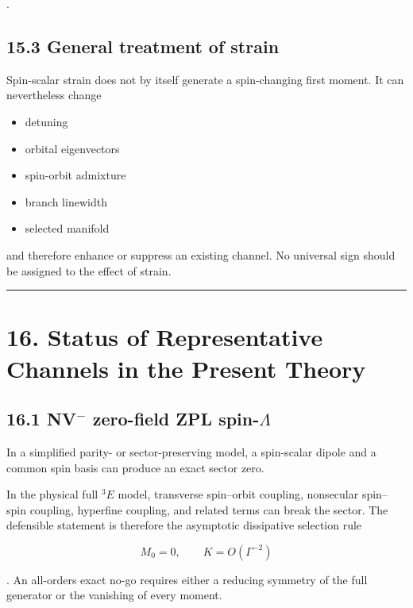 \documentclass[
  10pt,
  a4paper,
]{article}
\providecommand{\tightlist}{%
  \setlength{\itemsep}{0pt}\setlength{\parskip}{0pt}}
\begin{document}
.

\subsection{15.3 General treatment of
strain}\label{general-treatment-of-strain}

Spin-scalar strain does not by itself generate a spin-changing first
moment. It can nevertheless change

\begin{itemize}
\tightlist
\item
  detuning
\item
  orbital eigenvectors
\item
  spin-orbit admixture
\item
  branch linewidth
\item
  selected manifold
\end{itemize}

and therefore enhance or suppress an existing channel. No universal sign
should be assigned to the effect of strain.

\begin{center}\rule{0.5\linewidth}{0.5pt}\end{center}

\section{16. Status of Representative Channels in the Present
Theory}\label{status-of-representative-channels-in-the-present-theory}

\subsection{\texorpdfstring{16.1 NV\(^{-}\) zero-field ZPL
spin-\(\Lambda\)}{16.1 NV\^{}\{-\} zero-field ZPL spin-\textbackslash Lambda}}\label{nv--zero-field-zpl-spin-lambda}

In a simplified parity- or sector-preserving model, a spin-scalar dipole
and a common spin basis can produce an exact sector zero.

In the physical full \(^{3}E\) model, transverse spin--orbit coupling,
nonsecular spin--spin coupling, hyperfine coupling, and related terms
can break the sector. The defensible statement is therefore the
asymptotic dissipative selection rule

\[
M_0=0,
\qquad
K=O(\Gamma^{-2})
\]

. An all-orders exact no-go requires either a reducing symmetry of the
full generator or the vanishing of every moment.
\end{document}
